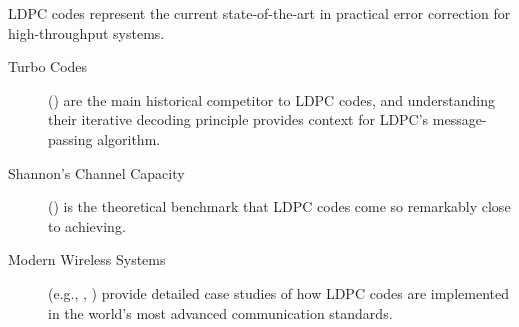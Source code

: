 \begin{importantbox}[title={Further Reading}]
    LDPC codes represent the current state-of-the-art in practical error correction for high-throughput systems.
    \begin{description}
        \item[Turbo Codes] () are the main historical competitor to LDPC codes, and understanding their iterative decoding principle provides context for LDPC's message-passing algorithm.
        \item[Shannon's Channel Capacity] () is the theoretical benchmark that LDPC codes come so remarkably close to achieving.
        \item[Modern Wireless Systems] (e.g., , ) provide detailed case studies of how LDPC codes are implemented in the world's most advanced communication standards.
    \end{description}
\end{importantbox}